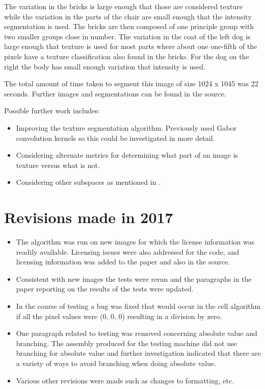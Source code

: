 \documentclass[twocolumn]{article}
\begin{document}
The variation in the bricks is large enough that those are considered texture
while the variation in the parts of the chair are small enough that the
intensity segmentation is used. The bricks are then composed of one principle
group with two smaller groups close in number. The variation in the coat of
the left dog is large enough that texture is used for most parts where about 
one one-fifth of the pixels have a texture classification also found in the
bricks. For the dog on the right the body has small enough variation that
intensity is used. 


The total amount of time taken to 
segment this image of size 1024 x 1045 was 22 seconds. Further images and 
segmentations can be found in the source.

Possible further work includes: 
\begin{itemize}

\item Improving the texture segmentation algorithm. Previously
\cite{prev} used Gabor convolution kernels \cite{gabor} so this could be
investigated in more detail. 

\item Considering alternate metrics for determining what part of
an image is texture versus what is not. 

\item Considering other subspaces as mentioned in \cite{prev}.

\end{itemize}

\section{Revisions made in 2017}

\begin{itemize}

\item The algorithm was run on new images for which the license information
  was readily available. Licensing issues were also addressed for the code,
  and licensing information was added to the paper and also in the source.

\item Consistent with new images the tests were rerun and the paragraphs in
  the paper reporting on the results of the tests were updated. 

\item In the course of testing a bug was fixed that would occur in the cell
  algorithm if all the pixel values were (0, 0, 0) resulting in a division by
  zero.

\item One paragraph related to testing was removed concerning absolute value
  and branching. The assembly produced for the testing machine did not use
  branching for absolute value and further investigation indicated that there
  are a variety of ways to avoid branching when doing absolute value. 

\item Various other revisions were made such as changes to formatting, etc.

\end{itemize}

\nocite{fusion2}
\nocite{fusion3}



\end{document}
